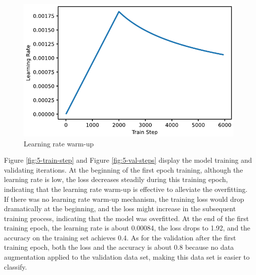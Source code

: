 \begin{figure}[!htbp]
    \centering
    \includegraphics[width=.7\textwidth]{evaluation/imgs/5-lr-warmup.pdf}
    \caption{Learning rate warm-up}
    \label{fig:5-lr-warmup}
\end{figure}

Figure \ref{fig:5-train-step} and Figure \ref{fig:5-val-steps} display the model training and validating iterations.
At the beginning of the first epoch training, although the learning rate is low, the loss decreases steadily during this training epoch, indicating that the learning rate warm-up is effective to alleviate the overfitting.
If there was no learning rate warm-up mechanism, the training loss would drop dramatically at the beginning, and the loss might increase in the subsequent training process, indicating that the model was overfitted.
At the end of the first training epoch, the learning rate is about 0.00084, the loss drops to 1.92, and the accuracy on the training set achieves 0.4.
As for the validation after the first training epoch, both the loss and the accuracy is about 0.8 because no data augmentation applied to the validation data set, making this data set is easier to classify.

